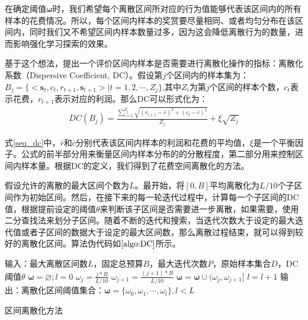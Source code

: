 在确定阈值$\bm{\omega}$时，我们希望每个离散区间所对应的行为值能够代表该区间内的所有样本的花费情况。所以，每个区间内样本的奖赏要尽量相同、或者均匀分布在该区间内，同时我们又不希望区间内样本数量过多，因为这会降低离散行为的数量，进而影响强化学习探索的效果。

基于这个想法，提出一个评价区间内样本是否需要进行离散化操作的指标：离散化系数（Dispersive Coefficient, DC）。假设第$j$个区间内的样本集为：$B_{j}=\{<\mathbf{s}_{t},c_{t},r_{t+1},\mathbf{s}_{t+1}>|t=1,2,\cdots,Z_{j}\}$,其中$Z_{i}$为第$j$个区间的样本个数，$c_{t}$表示花费，$r_{t+1}$表示对应的利润。那么DC可以形式化为：
\begin{equation}\label{seq_dc}
\begin{aligned}
DC(B_{j})=\frac{\sum_{l=1}^{Z_{j}}\sqrt{(r_{l+1}-\bar{r})^2+(c_{l}-\bar{c})^2}}{Z_{j}}+\xi \sqrt{Z_{j}}
\end{aligned}
\end{equation}

式\eqref{seq_dc}中，$\bar{r}$和$\bar{c}$分别代表该区间内样本的利润和花费的平均值，$\xi$是一个平衡因子。公式的前半部分用来衡量区间内样本分布的的分散程度，第二部分用来控制区间内样本量。根据DC的定义，我们得到了花费空间离散化的方法。

假设允许的离散的最大区间个数为$L$。最开始，将$[0,B]$平均离散化为$L/10$个子区间作为初始区间。然后，在接下来的每一轮迭代过程中，计算每一个子区间的DC值，根据提前设定的阈值$\theta$来判断该子区间是否需要进一步离散，如果需要，使用二分查找法来划分子区间。随着不断的迭代和搜索，当迭代次数大于设定的最大迭代值或者子区间的数据大于设定的最大区间数，那么离散过程结束，就可以得到较好的离散化区间。算法伪代码如$\ref{algo:DC}$所示。
\begin{algorithm}[htbp]
\small
\SetAlgoLined
{} 
输入：最大离散区间数$L$，固定总预算$B$，最大迭代次数$P$，原始样本集合$D$，DC阈值$\theta$\;
$\bm{\omega}=\varnothing; l=0$\;
	{$\omega_{j}=\frac{j*B}{L/10}$\;
	$\omega_{j+1}=\frac{(j+1)*B}{L/10}$\;
	$\bm{\omega}=\bm{\omega} \cup (\omega_{j},\omega_{j+1}]$\;
	$l=l+1$\;
	}
\While{$l<L$ 且 $p<P$}{
	\For{$all interval (\omega_{j},\omega_{j+1}] \in \bm{\omega}$}{
		$dc=DC(B_{j})$，其中$B_{j}$为第$j$个区间的样本集合\;
		\If{$dc>\theta$}{
			$\omega^{'}=\frac{\omega_{j}+\omega_{j+1}}{2}$\;
			$\bm{\omega}=\bm{\omega} \backslash (\omega_{j},\omega_{j+1}]$\;
			$\bm{\omega}=\bm{\omega} \cup (\omega_{j},\omega^{'}]$\;
			$\bm{\omega}=\bm{\omega} \cup (\omega_{'},\omega^{j+1}]$\;
			$l=l+1$\;
		}
	}
	$p=p+1$\;
}
输出：离散化区间阈值集合：$\bm{\omega}=\{\omega_{0},\omega_{1},\cdots,\omega_{l}\}, l<L$\;
\caption{区间离散化方法}
\label{algo:DC}
\end{algorithm}

